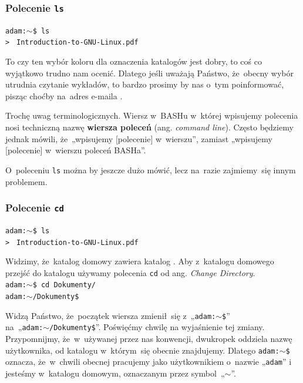 \documentclass[10pt,t]{beamer}
\begin{document}
\begin{frame}
  \frametitle{Polecenie \texttt{ls}}


  \texttt{adam:$\sim$\$ ls} \\
  \texttt{> } \quad
  \texttt{Introduction-to-GNU-Linux.pdf} \quad
  \texttt{}

  To czy ten wybór koloru dla oznaczenia katalogów jest dobry, to coś co
  wyjątkowo trudno nam ocenić. Dlatego jeśli uważają Państwo, że~obecny
  wybór utrudnia czytanie wykładów, to bardzo prosimy by nas o~tym
  poinformować, pisząc choćby na~adres e-maila \email.

  Trochę uwag terminologicznych. Wiersz w~BASHu w~której wpisujemy polecenia
  nosi techniczną nazwę \textbf{wiersza poleceń}
  (ang. \textit{command line}). Często będziemy jednak mówili,
  że~„wpisujemy [polecenie] w~wierszu”, zamiast
  „wpisujemy [polecenie] w~wierszu poleceń BASHa”.

  O~poleceniu \texttt{ls} można by jeszcze dużo mówić, lecz na~razie
  zajmiemy~się innym problemem.

\end{frame}





\begin{frame}
  \frametitle{Polecenie \texttt{cd}}


  \texttt{adam:$\sim$\$ ls} \\
  \texttt{> } \quad
  \texttt{Introduction-to-GNU-Linux.pdf} \quad
  \texttt{}

  Widzimy, że~katalog domowy zawiera katalog
  \texttt{}. Aby z~katalogu domowego przejść do
  katalogu \texttt{} używamy polecenia
  \texttt{cd} od ang. \textit{Change Directory}.\\
  \texttt{adam:$\sim$\$ cd Dokumenty/} \\
  \texttt{adam:$\sim$/Dokumenty\$}

  Widzą Państwo, że~początek wiersza zmienił~się z~„\texttt{adam:$\sim$\$}” \\
  na~„\texttt{adam:$\sim$/Dokumenty\$}”. Poświęćmy chwilę na wyjaśnienie tej
  zmiany. Przypomnijmy, że~w~używanej przez nas konwencji,
  dwukropek oddziela nazwę użytkownika, od katalogu w~którym~się obecnie
  znajdujemy. Dlatego \texttt{adam:$\sim$\$} oznacza, że~w~chwili obecnej
  pracujemy jako użytkownikiem o~nazwie „\texttt{adam}” i~ jesteśmy
  w~katalogu domowym, oznaczanym przez symbol~„$\sim$”.

\end{frame}
\end{document}
